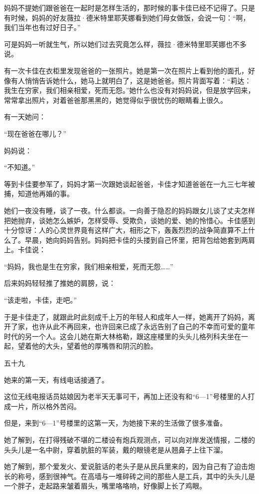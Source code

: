 妈妈不提她们跟爸爸在一起时是怎样生活的，那时候的事卡佳已经不记得了。只是有时候，妈妈的好友薇拉·德米特里耶芙娜看到她们母女做饭，会说一句：“啊，我们当年也有过好日子。”

可是妈妈一听就生气，所以她们过去究竟怎么样，薇拉·德米特里耶芙娜也不多说。

有一次卡佳在衣柜里发现爸爸的一张照片。她是第一次在照片上看到他的面孔，好像有人悄悄告诉她什么，她马上就明白了，这是她爸爸。照片背面写着：“莉达：我生在穷家，我们相亲相爱，死而无怨。”她什么也没有对妈妈说，但是放学回来，常常拿出照片，对着爸爸那黑黑的，她觉得似乎很忧伤的眼睛看上很久。

有一天她问：

“现在爸爸在哪儿？”

妈妈说：

“不知道。”

等到卡佳要参军了，妈妈才第一次跟她谈起爸爸，卡佳才知道爸爸在一九三七年被捕，知道他再婚的事。

她们一夜没有睡，谈了一夜。什么都谈。一向善于隐忍的妈妈跟女儿谈了丈夫怎样把她抛弃，谈她怎么嫉妒，怎样受辱、受欺负，谈她的爱、她的怜惜心。卡佳感到十分惊讶：人的心灵世界竟有这样广大，相形之下，轰轰烈烈的战争简直算不上什么了。早晨，她向妈妈告别。妈妈把卡佳的头搂到自己怀里，把背包给她套到两肩上。卡佳说：

“妈妈，我也是生在穷家，我们相亲相爱，死而无怨……”

后来妈妈轻轻推了推她的肩膀，说：

“该走啦，卡佳，走吧。”

于是卡佳走了，就跟此时此刻成千上万的年轻人和成年人一样，她离开了妈妈，离开了家，也许从此不再回来，也许回来已成了永远告别了自己的不幸而可爱的童年时代的另一个人。这会儿她在斯大林格勒，跟这座楼里的头头儿格列科夫坐在一起，望着他的大头，望着他的厚嘴唇和阴沉的脸。

五十九

她来的第一天，有线电话接通了。

这位无线电报话员姑娘因为老半天无事可干，再加上还没有和“6—1”号楼里的人打成一片，所以格外苦闷。

但是，来到“6—1”号楼里的这第一天，为她接下来的生活做了很多准备。

她了解到，在打得残破不堪的二楼设有炮兵观测点，可以向对岸发送情报，二楼的头头儿是一名中尉，穿着肮脏的军装，戴的眼镜老是从翘鼻子上往下溜。

她了解到，那个爱发火、爱说脏话的老头子是从民兵里来的，因为自己有了迫击炮长的称号，感到很神气。在高墙与一堆碎砖之间的那些人是工兵，其中的头头儿是一个胖子，走起路来皱着眉头，嘴里咯咯响，好像脚上长了鸡眼。

